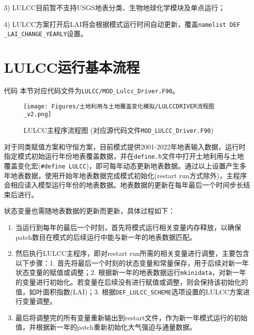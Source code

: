 3) LULCC目前暂不支持USGS地表分类、生物地球化学模块及单点运行；

4) LULCC方案打开后LAI将会根据模式运行时间自动更新，覆盖\texttt{namelist DEF\- \_LAI\_CHANGE\_YEARLY}设置。


\section{LULCC运行基本流程}
\begin{mymdframed}{代码}
  本节对应代码文件为\texttt{LULCC/MOD\_Lulcc\_Driver.F90}。
\end{mymdframed}

{
  \begin{figure}[htbp]
    \centering
    \texttt{[image: Figures/土地利用与土地覆盖变化模拟/LULCCDRIVER流程图\_v2.png]}
    \caption[LULCC主程序流程图]{LULCC主程序流程图 (对应源代码文件\texttt{MOD\_LULCC\_Driver.F90})}
    \label{fig:LULCC主程序流程图}
  \end{figure}
}

对于同类赋值方案和守恒方案，目前模式提供2001-2022年地表输入数据，运行时指定模式初始运行年份地表覆盖数据，并在\texttt{define.h}文件中打开土地利用与土地覆盖变化宏(\texttt{\#define LULCC})，即可每年动态更新地表数据。通过以上设置产生多年地表数据，使用开始年地表数据完成模式初始化(restart run方式除外)，主程序会相应读入模型运行年份的地表数据。地表数据的更新在每年最后一个时间步长结束后进行。

状态变量也需随地表数据的更新而更新，具体过程如下：

\begin{enumerate}
  \item 当运行到每年的最后一个时刻，首先将模式运行相关变量内存释放，以确保patch数目在模式的后续运行中能与新一年的地表数据匹配。

  \item 然后执行LULCC主程序，即对restart run所需的相关变量进行调整，主要包含以下步骤：1. 首先将最后一个时刻的状态变量和常量保存，用于后续对新一年状态变量的赋值或调整；2. 根据新一年的地表数据运行\texttt{mkinidata}，对新一年的变量进行初始化。若变量在后续没有进行赋值或调整，则会保持该初始化的值，如叶面积指数(LAI)；3. 根据\texttt{DEF\_LULCC\_SCHEME}选项设置的LULCC方案进行变量调整。

  \item 最后将调整完的所有变量重新输出到restart文件，作为新一年模式运行的初始值，并根据新一年的patch重新初始化大气强迫与通量数据。
\end{enumerate}

